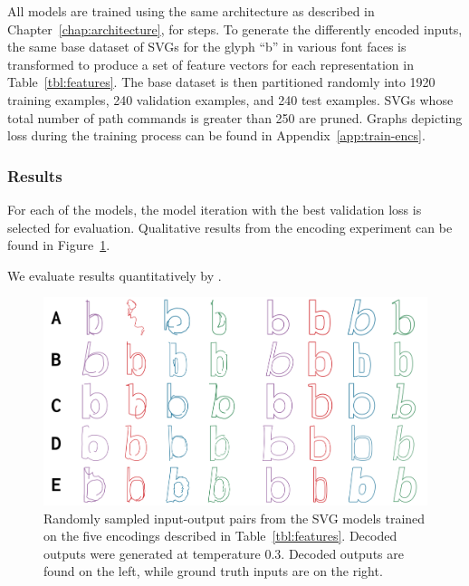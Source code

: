 All models are trained using the same architecture as described in Chapter~\ref{chap:architecture}, for  steps.
To generate the differently encoded inputs, the same base dataset of SVGs for the glyph ``b'' in various font faces is transformed to produce a set of feature vectors for each representation in Table~\ref{tbl:features}.
The base dataset is then partitioned randomly into 1920 training examples, 240 validation examples, and 240 test examples.
SVGs whose total number of path commands is greater than 250 are pruned.
Graphs depicting loss during the training process can be found in Appendix~\ref{app:train-encs}.

\subsubsection{Results}
For each of the models, the model iteration with the best validation loss is selected for evaluation.
Qualitative results from the encoding experiment can be found in Figure~\ref{fig:encodings}.

We evaluate results quantitatively by .

\begin{figure}[t]
	\includegraphics[width=\textwidth]{figures/encodings}
    \caption[Visual results of training the SVG model with different encodings]{Randomly sampled input-output pairs from the SVG models trained on the five encodings described in Table~\ref{tbl:features}. Decoded outputs were generated at temperature 0.3. Decoded outputs are found on the left, while ground truth inputs are on the right.\label{fig:encodings}}
\end{figure}
